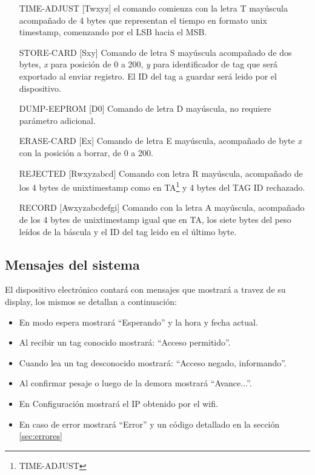 \begin{itemize}
	\item[TIME-ADJUST] [Twxyz] el comando comienza con la letra T mayúscula acompañado de 4 bytes que representan el tiempo en formato unix timestamp, comenzando por el LSB hacia el MSB\label{itm:ta}.
	\item[STORE-CARD] [Sxy] Comando de letra S mayúscula acompañado de dos bytes, \emph{x} para posición de 0 a 200, \emph{y} para identificador de tag que será exportado al enviar registro. El ID del tag a guardar será leido por el dispositivo.\label{itm:sc}
	\item[DUMP-EEPROM] [D0] Comando de letra D mayúscula, no requiere parámetro adicional.
	\item[ERASE-CARD] [Ex] Comando de letra E mayúscula, acompañado de byte \emph{x} con la posición a borrar, de 0 a 200.
	\item[REJECTED] [Rwxyzabcd] Comando con letra R mayúscula, acompañado de los 4 bytes de unixtimestamp como en TA\footnote{TIME-ADJUST} y 4 bytes del TAG ID rechazado.
	\item[RECORD] [Awxyzabcdefgi] Comando con la letra A mayúscula, acompañado de los 4 bytes de unixtimestamp igual que en TA, los siete bytes del peso leídos de la báscula y el ID del tag leido en el último byte.
\end{itemize}

\subsection{Mensajes del sistema}
El dispositivo electrónico contará con mensajes que mostrará a travez de su display, los mismos se detallan a continuación:
\begin{itemize}
	\item En modo espera mostrará ``Esperando'' y la hora y fecha actual.
	\item Al recibir un tag conocido mostrará: ``Acceso permitido''.
	\item Cuando lea un tag desconocido mostrará: ``Acceso negado, informando''.
	\item Al confirmar pesaje o luego de la demora mostrará ``Avance...''.
	\item En Configuración mostrará el IP obtenido por el wifi. 
	\item En caso de error mostrará ``Error'' y un código detallado en la sección \ref{sec:errores}
\end{itemize}

